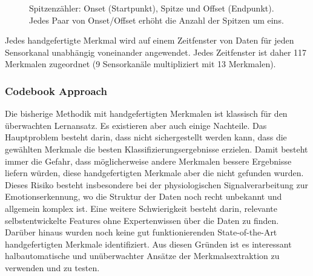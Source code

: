 \begin{figure}[h] 
\caption{ Spitzenzähler: Onset (Startpunkt), Spitze und Offset (Endpunkt). Jedes Paar von Onset/Offset erhöht die Anzahl der Spitzen um eins.} 
\label{fig:peaks} \end{figure} \vspace{0.5cm}


Jedes handgefertigte Merkmal wird auf einem Zeitfenster von Daten für jeden Sensorkanal unabhängig voneinander angewendet. 
Jedes Zeitfenster ist daher 117 Merkmalen zugeordnet (9 Sensorkanäle multipliziert mit 13 Merkmalen). \\





\subsubsection{Codebook Approach} \label{ca-1}


Die bisherige Methodik mit handgefertigten Merkmalen ist klassisch für den überwachten Lernansatz. 
Es existieren aber auch einige Nachteile. 
Das Hauptproblem besteht darin, dass nicht sichergestellt werden kann, dass die gewählten Merkmale die besten Klassifizierungsergebnisse erzielen. Damit besteht immer die Gefahr, dass möglicherweise andere Merkmalen bessere Ergebnisse liefern würden, diese handgefertigten Merkmale aber die  nicht gefunden wurden. Dieses Risiko besteht insbesondere bei der physiologischen Signalverarbeitung zur Emotionserkennung, wo die Struktur der Daten noch recht unbekannt und allgemein komplex ist. 
Eine weitere Schwierigkeit besteht darin, relevante selbstentwickelte Features ohne Expertenwissen über die Daten zu finden.
Darüber hinaus wurden noch keine gut funktionierenden State-of-the-Art handgefertigten Merkmale identifiziert.
Aus diesen Gründen ist es interessant halbautomatische und unüberwachter Ansätze der Merkmalsextraktion zu verwenden und zu testen. \\



